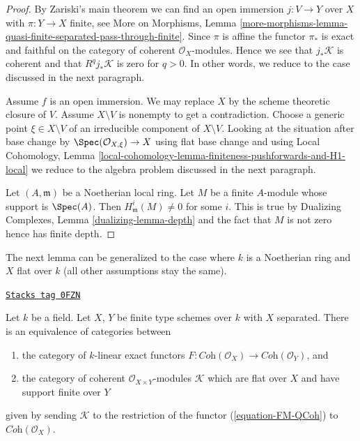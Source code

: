 \begin{proof}
By Zariski's main theorem we can find an open immersion
$j : V \to Y$ over $X$ with $\pi : Y \to X$ finite, see
More on Morphisms, Lemma
\ref{more-morphisms-lemma-quasi-finite-separated-pass-through-finite}.
Since $\pi$ is affine the functor $\pi_*$ is exact and faithful
on the category of coherent $\mathcal{O}_X$-modules.
Hence we see that $j_*\mathcal{K}$ is coherent and
that $R^qj_*\mathcal{K}$ is zero for $q > 0$.
In other words, we reduce to the case discussed in the next paragraph.

\medskip\noindent
Assume $f$ is an open immersion. We may replace $X$ by the
scheme theoretic closure of $V$. Assume $X \setminus V$ is nonempty
to get a contradiction. Choose a generic point $\xi \in X \setminus V$
of an irreducible component of $X \setminus V$. Looking at the situation
after base change by $\Spec(\mathcal{O}_{X, \xi}) \to X$ using flat base
change and using
Local Cohomology, Lemma
\ref{local-cohomology-lemma-finiteness-pushforwards-and-H1-local}
we reduce to the algebra problem discussed in the next paragraph.

\medskip\noindent
Let $(A, \mathfrak m)$ be a Noetherian local ring. Let $M$ be a finite
$A$-module whose support is $\Spec(A)$. Then $H^i_\mathfrak m(M) \not = 0$
for some $i$. This is true by
Dualizing Complexes, Lemma \ref{dualizing-lemma-depth}
and the fact that $M$ is not zero hence has finite depth.
\end{proof}

The next lemma can be generalized to the case where $k$ is a
Noetherian ring and $X$ flat over $k$ (all other assumptions
stay the same).

\begin{lemma}
\label{functors-lemma-functor-coherent-over-field}
\href{https://stacks.math.columbia.edu/tag/0FZN}{\texttt{Stacks tag 0FZN}}

Let $k$ be a field. Let $X$, $Y$ be finite type schemes over $k$ with
$X$ separated. There is an equivalence of categories between
\begin{enumerate}
\item the category of $k$-linear exact functors
$F : \textit{Coh}(\mathcal{O}_X) \to \textit{Coh}(\mathcal{O}_Y)$, and
\item the category of coherent $\mathcal{O}_{X \times Y}$-modules
$\mathcal{K}$ which are flat over $X$ and have support finite over $Y$
\end{enumerate}
given by sending $\mathcal{K}$ to the restriction of the functor
(\ref{equation-FM-QCoh}) to $\textit{Coh}(\mathcal{O}_X)$.
\end{lemma}

